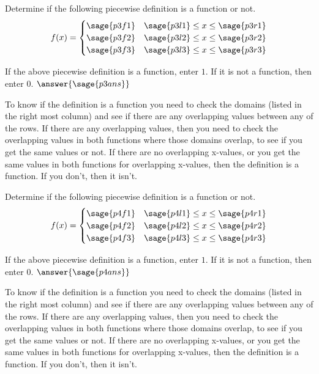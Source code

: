 \documentclass{ximera}
\begin{document}
\begin{problem}
    Determine if the following piecewise definition is a function or not. 
    \[
        f(x) =
            \begin{cases}
                \sage{p3f1}     & \sage{p3l1}\leq x \leq \sage{p3r1} \\
                \sage{p3f2}     & \sage{p3l2} \leq x \leq \sage{p3r2} \\
                \sage{p3f3}     & \sage{p3l3} \leq x \leq \sage{p3r3}
            \end{cases}
    \]
    
    If the above piecewise definition is a function, enter $1$. If it is not a function, then enter $0$.
    $\answer{\sage{p3ans}}$
    \begin{feedback}
        To know if the definition is a function you need to check the domains (listed in the right most column) and see if there are any overlapping values between any of the rows. If there are any overlapping values, then you need to check the overlapping values in both functions where those domains overlap, to see if you get the same values or not. If there are no overlapping x-values, or you get the same values in both functions for overlapping x-values, then the definition is a function. If you don't, then it isn't.
    \end{feedback}
    
\end{problem}




\begin{problem}
    Determine if the following piecewise definition is a function or not. 
    \[
        f(x) =
            \begin{cases}
                \sage{p4f1}     & \sage{p4l1}\leq x \leq \sage{p4r1} \\
                \sage{p4f2}     & \sage{p4l2} \leq x \leq \sage{p4r2} \\
                \sage{p4f3}     & \sage{p4l3} \leq x \leq \sage{p4r3}
            \end{cases}
    \]
    
    If the above piecewise definition is a function, enter $1$. If it is not a function, then enter $0$.
    $\answer{\sage{p4ans}}$
    \begin{feedback}
        To know if the definition is a function you need to check the domains (listed in the right most column) and see if there are any overlapping values between any of the rows. If there are any overlapping values, then you need to check the overlapping values in both functions where those domains overlap, to see if you get the same values or not. If there are no overlapping x-values, or you get the same values in both functions for overlapping x-values, then the definition is a function. If you don't, then it isn't.
    \end{feedback}
    
\end{problem}
\end{document}
